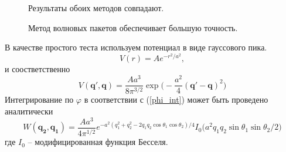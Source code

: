 \documentclass[a4paper,12pt]{article}
\newcommand{\vect}[1]{\boldsymbol{#1}}
\begin{document}
	\begin{figure}[h!]
  \caption{Результаты обоих методов совпадают.}
  \label{fig:skatter11}
  \end{figure}
  
	\begin{figure}[h!]
  \caption{Метод волновых пакетов обеспечивает большую точность.}
  \label{fig:skatter12}
  \end{figure}
	
	В качестве простого теста используем потенциал в виде гауссового пика.
	\begin{equation}
	   V(r) = A e^{-r^2/a^2},
	\end{equation}
	и соостветственно
	\begin{equation}
	   V(\vect{q'},\vect{q}) = \frac{Aa^3}{8\pi^{3/2}}\exp\big( - \frac{a^2}{4}(\vect{q'}-\vect{q})^2 \big)
	\end{equation}
	Интегрирование по $\varphi$ в соответствии с (\ref{phi_int}) может быть проведено аналитически
	\begin{equation}
	   W(\vect{q_2},\vect{q_1}) = \frac{Aa^3}{4\pi^{1/2}} e^{ - a^2( q_1^2 + q_2^2 - 2q_1q_2\cos\theta_1\cos\theta_2)/4 }
	    I_0 \big( a^2q_1q_2\sin\theta_1\sin\theta_2/2 \big)
	\end{equation}
	где $I_0$ -- модифицированная функция Бесселя.
	
\end{document}

